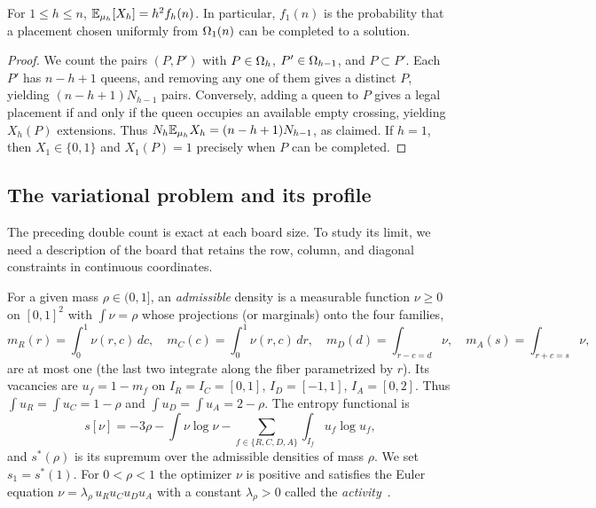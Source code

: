\begin{lema}\label{lem:interpretacion} For $1\le h\le n$, $\mathbb{E}_{\mu_h}[X_h]=h^2f_h(n)$. In particular,
$f_1(n)$ is the probability that
a placement chosen uniformly from $\Omega_1(n)$ can be completed to a solution. \end{lema}

\begin{proof} We count the pairs $(P,P')$ with $P\in\Omega_h$, $P'\in\Omega_{h-1}$, and $P\subset P'$. Each $P'$
has $n-h+1$ queens, and
removing any one of them gives a distinct $P$, yielding $(n-h+1)N_{h-1}$ pairs. Conversely, adding a queen
to $P$ gives a legal
placement if and only if the queen occupies an available empty crossing, yielding $X_h(P)$ extensions. Thus
$N_h\mathbb{E}_{\mu_h}X_h=(n-h+1)N_{h-1}$, as claimed. If $h=1$, then $X_1\in\{0,1\}$ and $X_1(P)=1$ precisely when
$P$ can be completed.
\end{proof}

\subsection{The variational problem and its profile}\label{subsec:variacional}

The preceding double count is exact at each board size. To study its limit, we need a description of the
board that retains the row,
column, and diagonal constraints in continuous coordinates.

For a given mass $\rho\in(0,1]$, an \emph{admissible} density is a measurable function $\nu\ge0$ on
$[0,1]^2$ with $\int\nu=\rho$ whose
projections (or marginals) onto the four families, \[
 m_R(r)=\int_0^1\nu(r,c)\,dc,\quad m_C(c)=\int_0^1\nu(r,c)\,dr,\quad
 m_D(d)=\int_{r-c=d}\nu,\quad m_A(s)=\int_{r+c=s}\nu,
\] are at most one (the last two integrate along the fiber parametrized by $r$). Its vacancies are
$u_f=1-m_f$ on $I_R=I_C=[0,1]$,
$I_D=[-1,1]$, $I_A=[0,2]$. Thus $\int u_R=\int u_C=1-\rho$ and $\int u_D=\int u_A=2-\rho$. The entropy
functional is \[
 s[\nu]=-3\rho-\int\nu\log\nu-\sum_{f\in\{R,C,D,A\}}\int_{I_f}u_f\log u_f ,
\] and $s^*(\rho)$ is its supremum over the admissible densities of mass $\rho$. We set $s_1=s^*(1)$. For
$0<\rho<1$ the optimizer
$\nu$ is positive and satisfies the Euler equation $\nu=\lambda_\rho\,u_Ru_Cu_Du_A$ with a constant
$\lambda_\rho>0$ called the
\emph{activity}~\cite[Theorem~3.1 and Lemma~3.3]{Perfil}.

